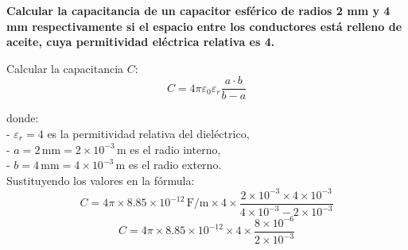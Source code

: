 \documentclass[answers]{exam} %
\begin{document}
\begin{questions}
\begin{center}
        \end{center}
    \newpage
    \question \large\textbf{Calcular la capacitancia de un capacitor esférico de radios 2 mm y 4 mm
    respectivamente si el espacio entre los conductores está relleno de aceite, cuya
    permitividad eléctrica relativa es 4.}

    
        Calcular la capacitancia \( C \):
        \[
        \boxed{C = 4 \pi \varepsilon_0 \varepsilon_r \frac{a \cdot b}{b - a}}
        \]

        donde:\\
        - \( \varepsilon_r = 4 \) es la permitividad relativa del dieléctrico,\\
        - \( a = 2 \, \text{mm} = 2 \times 10^{-3} \, \text{m} \) es el radio interno,\\
        - \( b = 4 \, \text{mm} = 4 \times 10^{-3} \, \text{m} \) es el radio externo.\\
        
        Sustituyendo los valores en la fórmula:
        \[
        C = 4 \pi \times 8.85 \times 10^{-12} \, \text{F/m} \times 4 \times \frac{2 \times 10^{-3} \times 4 \times 10^{-3}}{4 \times 10^{-3} - 2 \times 10^{-3}}
        \]
        \[
        C = 4 \pi \times 8.85 \times 10^{-12} \times 4 \times \frac{8 \times 10^{-6}}{2 \times 10^{-3}}
        \]
        

\end{questions}
\end{document}
